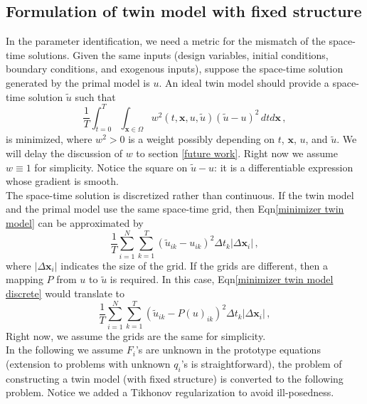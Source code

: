 \documentclass[a4paper,onecolumn]{article}
\theoremstyle{remark}
\begin{document}
\subsection{Formulation of twin model with fixed structure}
\label{general formulation}
\noindent In the parameter identification,
we need a metric for the mismatch of the space-time solutions.
Given the same inputs (design variables, initial conditions, boundary conditions, and exogenous 
inputs), 
suppose the space-time solution generated by the primal model is $u$.
An ideal twin model should provide a space-time solution $\tilde{u}$ such that
\begin{equation}
    \frac{1}{T}
    \int_{t=0}^T\int_{\mathbf{x}\in\Omega} w^2(t,\mathbf{x}, u,\tilde{u}) (\tilde{u} - 
    u)^2 \, dtd\mathbf{x}\,,
    \label{minimizer twin model}
\end{equation}
is minimized,
where $w^2>0$ is a weight possibly depending on $t$, $\mathbf{x}$, $u$, and $\tilde{u}$.
We will delay the discussion of $w$ to section \ref{future work}.
Right now we assume $w\equiv 1$ for simplicity.
Notice the square on $\tilde{u}-u$: it is a differentiable expression
whose gradient is smooth.\\

\noindent The space-time solution is discretized rather than continuous. 
If the twin model and the 
primal model use the same space-time grid, then Eqn\eqref{minimizer twin model} can be
approximated by
\begin{equation}
    \frac{1}{T}
    \sum_{i=1}^{N}\sum_{k=1}^{T} \left(\tilde{u}_{ik} - u_{ik}\right)^2 \Delta t_k
    \left| \Delta \mathbf{x}_i \right|\,,
    \label{minimizer twin model discrete}
\end{equation}
where $\left| \Delta \mathbf{x}_i \right|$ indicates the size of the grid.
If the grids are different, then a mapping $P$ from $u$ to $\tilde{u}$ is required.
In this case, Eqn\eqref{minimizer twin model discrete} would translate to
\begin{equation}
    \frac{1}{T}
    \sum_{i=1}^{N}\sum_{k=1}^{T} \left(\tilde{u}_{ik} - P(u)_{ik}\right)^2 \Delta t_k
    \left| \Delta \mathbf{x}_i \right|\,,
    \label{minimizer twin model discrete mapping}
\end{equation}
Right now, we assume the grids are the same for simplicity.\\

\noindent 
In the following we assume $F_i$'s are unknown in the prototype equations
(extension to problems with unknown $q_i$'s
is straightforward), 
the problem of constructing a twin model (with fixed structure)
is converted to the following problem. Notice we added a Tikhonov regularization
to avoid ill-posedness. \\
\end{document}
